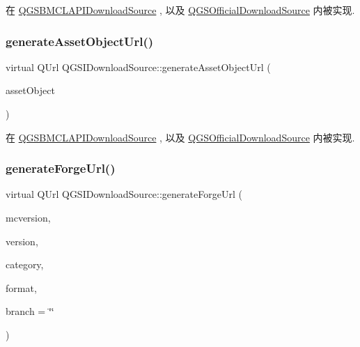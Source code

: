 在 \mbox{\hyperlink{class_q_g_s_b_m_c_l_a_p_i_download_source_a05bfabb12439b0d805bbc0e272cb23df}{Q\+G\+S\+B\+M\+C\+L\+A\+P\+I\+Download\+Source}} , 以及 \mbox{\hyperlink{class_q_g_s_official_download_source_a67b08e7a797211563db49c3357631c46}{Q\+G\+S\+Official\+Download\+Source}} 内被实现.

\mbox{\label{class_q_g_s_i_download_source_acf94724d53217be5f8ed39c035f8aece}} 
\subsubsection{\texorpdfstring{generate\+Asset\+Object\+Url()}{generateAssetObjectUrl()}}
{\footnotesize\ttfamily virtual Q\+Url Q\+G\+S\+I\+Download\+Source\+::generate\+Asset\+Object\+Url (\begin{DoxyParamCaption}\item[{const \mbox{\hyperlink{class_q_g_s_asset_object}{Q\+G\+S\+Asset\+Object}} \&}]{asset\+Object }\end{DoxyParamCaption})\hspace{0.3cm}{\ttfamily [pure virtual]}}



在 \mbox{\hyperlink{class_q_g_s_b_m_c_l_a_p_i_download_source_ac1c79d8971173771e2159d839099cf86}{Q\+G\+S\+B\+M\+C\+L\+A\+P\+I\+Download\+Source}} , 以及 \mbox{\hyperlink{class_q_g_s_official_download_source_a06f16b9134010980f1403caecc22a9af}{Q\+G\+S\+Official\+Download\+Source}} 内被实现.

\mbox{\label{class_q_g_s_i_download_source_af4e1b6edc009189c6b159041f3249ce2}} 
\subsubsection{\texorpdfstring{generate\+Forge\+Url()}{generateForgeUrl()}}
{\footnotesize\ttfamily virtual Q\+Url Q\+G\+S\+I\+Download\+Source\+::generate\+Forge\+Url (\begin{DoxyParamCaption}\item[{const Q\+String \&}]{mcversion,  }\item[{const Q\+String \&}]{version,  }\item[{const Q\+String \&}]{category,  }\item[{const Q\+String \&}]{format,  }\item[{const Q\+String \&}]{branch = {\ttfamily \char`\"{}\char`\"{}} }\end{DoxyParamCaption})\hspace{0.3cm}{\ttfamily [pure virtual]}}



